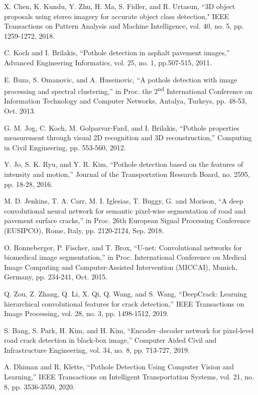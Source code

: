 \documentclass{ieeeaccess}
\begin{document}
\begin{thebibliography}{00}
 X. Chen, K. Kundu, Y. Zhu, H. Ma, S. Fidler, and R. Urtasun, ``3D object proposals using stereo imagery for accurate object class detection," IEEE Transactions on Pattern Analysis and Machine Intelligence, vol. 40, no. 5, pp. 1259-1272, 2018.

 C. Koch and I. Brilakis, ``Pothole detection in asphalt pavement images,'' Advanced Engineering Informatics, vol. 25, no. 1, pp.507-515, 2011.

 E. Buza, S. Omanovic, and A. Huseinovic, ``A pothole detection with image processing and spectral clustering,'' in Proc. the 2\textsuperscript{nd} International Conference on Information Technology and Computer Networks, Antalya, Turkeys, pp. 48-53, Oct. 2013.

 G. M. Jog, C. Koch, M. Golparvar-Fard, and I. Brilakis, ``Pothole properties measurement through visual 2D recognition and 3D reconstruction,'' Computing in Civil Engineering, pp. 553-560, 2012.

 Y. Jo, S. K. Ryu, and Y. R. Kim, ``Pothole detection based on the features of intensity and motion,'' Journal of the Transportation Research Board, no. 2595, pp. 18-28, 2016.

 M. D. Jenkins, T. A. Carr,  M. I. Iglesias, T. Buggy, G. and Morison, ``A deep convolutional neural network for semantic pixel-wise segmentation of road and pavement surface cracks,'' in Proc. 26th European Signal Processing Conference (EUSIPCO), Rome, Italy, pp. 2120-2124, Sep. 2018.

 O. Ronneberger, P. Fischer, and T. Brox, ``U-net: Convolutional networks for biomedical image segmentation,'' in Proc. International Conference on Medical Image Computing and Computer-Assisted Intervention (MICCAI), Munich, Germany, pp. 234-241, Oct. 2015.

 Q. Zou, Z. Zhang, Q. Li, X. Qi, Q. Wang, and S. Wang, ``DeepCrack: Learning hierarchical convolutional features for crack detection,'' IEEE Transactions on Image Processing, vol. 28, no. 3, pp. 1498-1512, 2019.

 S. Bang, S. Park, H. Kim, and H. Kim, ``Encoder–decoder network for pixel‐level road crack detection in black‐box image,''  Computer Aided Civil and Infrastructure Engineering, vol. 34, no. 8, pp. 713-727, 2019.

 A. Dhiman and R. Klette, ``Pothole Detection Using Computer Vision and Learning,'' IEEE Transactions on Intelligent Transportation Systems, vol. 21, no. 8, pp. 3536-3550, 2020.


\end{thebibliography}
\end{document}
